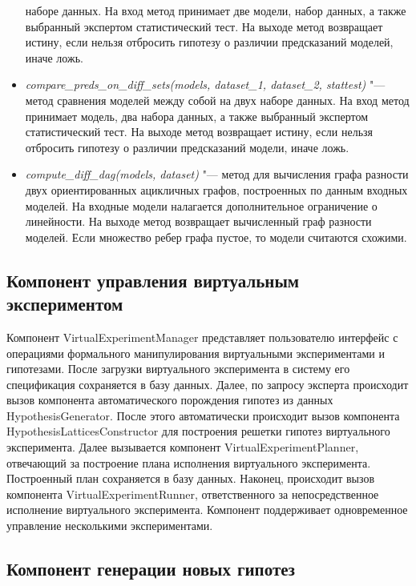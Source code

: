 \begin{itemize}
        наборе данных. На вход метод принимает две модели, набор данных, а также выбранный экспертом статистический 
        тест. На выходе метод возвращает истину, если нельзя отбросить гипотезу о 
        различии предсказаний моделей, иначе ложь. 
\item \textit{compare\_preds\_on\_diff\_sets(models, dataset\_1, dataset\_2, stattest)} "--- метод сравнения моделей 
        между собой на двух наборе данных. На вход метод принимает модель, два набора данных, а также выбранный 
        экспертом статистический тест. На выходе метод возвращает истину, если нельзя отбросить гипотезу о различии 
        предсказаний модели, иначе ложь.
\item \textit{compute\_diff\_dag(models, dataset)} "--- метод для вычисления графа разности двух ориентированных 
        ацикличных графов, построенных по данным входных моделей. На входные модели налагается 
        дополнительное ограничение о линейности. На выходе метод возвращает вычисленный граф разности моделей. 
        Если множество ребер графа пустое, то модели считаются схожими. 
\end{itemize}


\subsection{Компонент управления виртуальным экспериментом}\label{sect_4_2_1}
Компонент VirtualExperimentManager представляет пользователю интерфейс с операциями формального манипулирования 
виртуальными экспериментами и гипотезами. После загрузки виртуального эксперимента в систему его спецификация 
сохраняется в базу данных. Далее, по запросу эксперта происходит вызов компонента автоматического порождения 
гипотез из данных HypothesisGenerator. После этого автоматически происходит вызов компонента 
HypothesisLatticesConstructor для построения решетки гипотез виртуального эксперимента. Далее вызывается компонент 
VirtualExperimentPlanner, отвечающий за построение плана исполнения виртуального эксперимента. Построенный план 
сохраняется в базу данных. Наконец, происходит вызов компонента VirtualExperimentRunner, ответственного за 
непосредственное исполнение виртуального эксперимента. Компонент поддерживает одновременное управление 
несколькими экспериментами.


\subsection{Компонент генерации новых гипотез}\label{sect_4_2_2}

